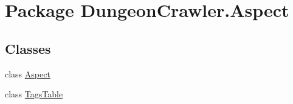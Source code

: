 \hypertarget{namespace_dungeon_crawler_1_1_aspect}{}\section{Package Dungeon\+Crawler.\+Aspect}
\label{namespace_dungeon_crawler_1_1_aspect}
\subsection*{Classes}
\begin{DoxyCompactItemize}
\item 
class \hyperlink{class_dungeon_crawler_1_1_aspect_1_1_aspect}{Aspect}
\item 
class \hyperlink{class_dungeon_crawler_1_1_aspect_1_1_tags_table}{Tags\+Table}
\end{DoxyCompactItemize}

